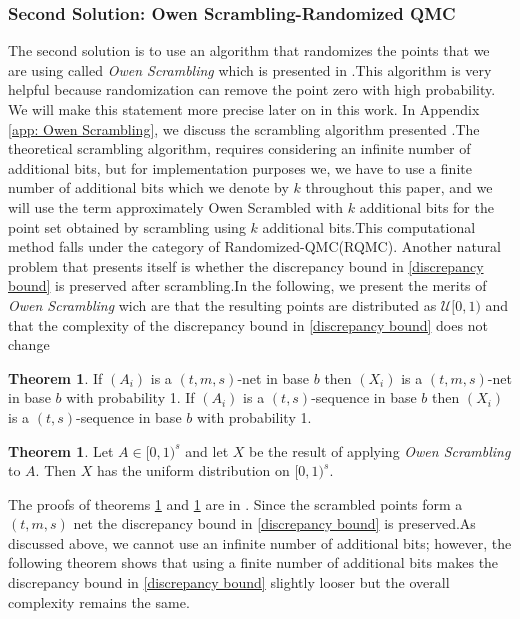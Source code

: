 \documentclass{article}
\theoremstyle{definition}
\newtheorem{theorem}[definition]{Theorem}
\begin{document}
\subsubsection{Second Solution: Owen Scrambling-Randomized QMC}
The second solution is to use an algorithm that randomizes the points that we are using called \textit{Owen Scrambling} which is presented in \cite{OwenArtB.1995RP(m} .This algorithm is very helpful because randomization can remove the point zero with high probability. We will make this statement more precise later on in this work. In Appendix \ref{app: Owen Scrambling}, we discuss the scrambling algorithm presented \cite{OwenArtB.1995RP(m}.The theoretical scrambling algorithm, requires considering an infinite number of additional bits, but for implementation purposes we, we have to use a finite number of additional bits which we denote by $k$ throughout this paper, and we will use the term approximately Owen Scrambled with $k$ additional bits for the point set obtained by scrambling using $k$ additional bits.This computational method  falls under the category of Randomized-QMC(RQMC). Another natural problem that presents itself is whether the discrepancy bound in \eqref{discrepancy bound} is preserved after scrambling.In the following, we present the merits of \textit{Owen Scrambling} wich are that the resulting points are distributed as $\mathcal{U}[0,1)$ and that the complexity of the discrepancy bound in \eqref{discrepancy bound} does not change
\begin{theorem}
\label{th:rp1}
 If $(A_i)$ is a $(t,m,s)$-net in base $b$ then $(X_i)$ is a $(t,m,s)$-net in base $b$ with probability 1. If $(A_i)$ is a $(t,s)$-sequence in base $b$ then $(X_i)$ is a $(t,s)$-sequence in base $b$ with probability 1.
\end{theorem}
\begin{theorem}
\label{resulting is uniformly distributed}
 Let \(A \in [0,1)^s\) and let \(X\) be the result of applying \emph{Owen Scrambling} to \(A\). Then \(X\) has the uniform distribution on \([0,1)^s\). \end{theorem}
\noindent The proofs of theorems \ref{th:rp1} and \ref{resulting is uniformly distributed} are in \cite{OwenArtB.1995RP(m}.
\noindent Since the scrambled points form a $(t,m,s)$ net the discrepancy bound in \eqref{discrepancy bound} is preserved.As discussed above, we cannot use an infinite number of additional bits; however, the following theorem shows that using a finite number of additional bits makes the discrepancy bound in \eqref{discrepancy bound} slightly looser but the overall complexity remains the same.
\end{document}

